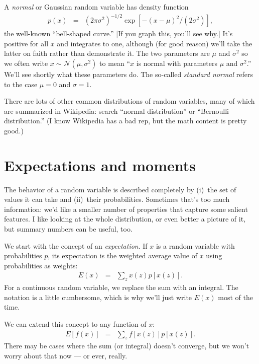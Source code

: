 \begin{itemize}
A {\it normal\/} or Gaussian random variable has density
function
\begin{eqnarray*}
    p(x) &=& (2 \pi \sigma^2)^{-1/2} \exp[-(x-\mu)^2/(2\sigma^2)] ,
\end{eqnarray*}
the well-known ``bell-shaped curve.''
[If you graph this, you'll see why.]
It's positive for all $x$ and integrates to one,
although (for good reason) we'll take the latter on faith rather than demonstrate it.
%
The two parameters are $\mu$ and $\sigma^2$ so we often
write $ x \sim \mathcal{N}(\mu, \sigma^2)$ to mean
``$x$ is normal with parameters $\mu$ and $\sigma^2$.''
We'll see shortly what these parameters do.
%
The so-called {\it standard normal\/} refers to the case
$\mu = 0$ and $\sigma = 1$.
\end{itemize}

There are lots of other common distributions of random variables,
many of which are summarized in Wikipedia:
search ``normal distribution'' or ``Bernoulli distribution.''
(I know Wikipedia
has a bad rep, but the math content is pretty good.)


\section{Expectations and moments}

The behavior of a random variable is described completely
by (i)~the set of values it can take
and (ii)~their probabilities.
Sometimes that's too much information:  we'd like a smaller number
of properties that capture some salient features.
I like looking at the whole distribution,
or even better a picture of it,
but summary numbers can be useful, too.

We start with the concept of an {\it expectation\/}.
If $x$ is a random variable with probabilities $p$,
its expectation is the weighted average value of $x$
using probabilities as weights:
\begin{eqnarray*}
    E (x) &=& \sum_z x(z) p[x(z)]  .
\end{eqnarray*}
For a continuous random variable,
we replace the sum with an integral.
The notation is a little cumbersome, which is why
we'll just write $E(x)$ most of the time.

We can extend this concept to any function of $x$:
\begin{eqnarray}
    E [f(x)] &=& \sum_z  f[x(z)] p[x(z)] .
    \label{eq:expectation}
\end{eqnarray}
There may be cases where the sum (or integral) doesn't converge,
but we won't worry about that now --- or ever, really.

